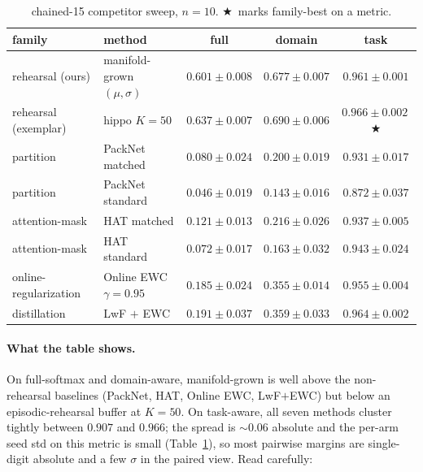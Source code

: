 \documentclass[11pt]{article}
\newcommand{\headline}{$\bigstar$}
\begin{document}
\begin{table}[h]
  \centering
  \caption{chained-15 competitor sweep, $n = 10$.
           \headline\ marks family-best on a metric.}
  \label{tab:competitor-sweep}
  \small
  \begin{tabular}{llccc}
    \toprule
    family                  & method                       & full              & domain            & task              \\
    \midrule
    rehearsal (ours)        & manifold-grown $(\mu,\sigma)$ & $0.601 \pm 0.008$ & $0.677 \pm 0.007$ & $0.961 \pm 0.001$ \\
    rehearsal (exemplar)    & hippo $K = 50$               & $0.637 \pm 0.007$ & $0.690 \pm 0.006$ & $0.966 \pm 0.002$\,\headline \\
    partition               & PackNet matched              & $0.080 \pm 0.024$ & $0.200 \pm 0.019$ & $0.931 \pm 0.017$ \\
    partition               & PackNet standard             & $0.046 \pm 0.019$ & $0.143 \pm 0.016$ & $0.872 \pm 0.037$ \\
    attention-mask          & HAT matched                  & $0.121 \pm 0.013$ & $0.216 \pm 0.026$ & $0.937 \pm 0.005$ \\
    attention-mask          & HAT standard                 & $0.072 \pm 0.017$ & $0.163 \pm 0.032$ & $0.943 \pm 0.024$ \\
    online-regularization   & Online EWC $\gamma = 0.95$   & $0.185 \pm 0.024$ & $0.355 \pm 0.014$ & $0.955 \pm 0.004$ \\
    distillation            & LwF $+$ EWC                  & $0.191 \pm 0.037$ & $0.359 \pm 0.033$ & $0.964 \pm 0.002$ \\
    \bottomrule
  \end{tabular}
\end{table}

\paragraph{What the table shows.}
On full-softmax and domain-aware, manifold-grown is well above the
non-rehearsal baselines (PackNet, HAT, Online EWC, LwF$+$EWC) but
below an episodic-rehearsal buffer at $K = 50$. On task-aware, all
seven methods cluster tightly between $0.907$ and $0.966$; the spread
is $\sim$0.06 absolute and the per-arm seed std on this metric is
small (Table~\ref{tab:competitor-sweep}), so most pairwise margins are
single-digit absolute and a few $\sigma$ in the paired view. Read
carefully:
\end{document}
